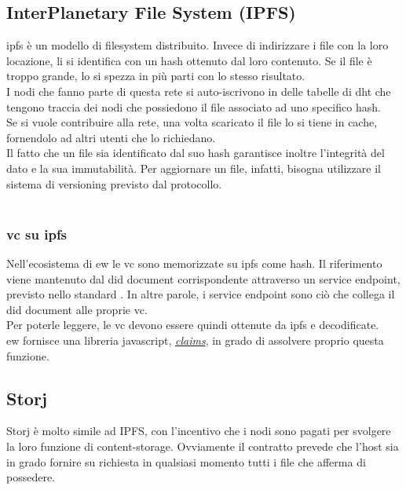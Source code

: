 \subsection{InterPlanetary File System (IPFS)}
\gls{ipfs} \cite{prod:ipfs} è un modello di filesystem distribuito.
Invece di indirizzare i file con la loro locazione, li si identifica con un hash ottenuto dal loro contenuto.
Se il file è troppo grande, lo si spezza in più parti con lo stesso risultato. \\
I nodi che fanno parte di questa rete si auto-iscrivono in delle tabelle di \gls{dht} che tengono traccia dei nodi che possiedono il file associato ad uno specifico hash. \\
Se si vuole contribuire alla rete, una volta scaricato il file lo si tiene in cache, fornendolo ad altri utenti che lo richiedano. \\
Il fatto che un file sia identificato dal suo hash garantisce inoltre l'integrità del dato e la sua immutabilità.
Per aggiornare un file, infatti, bisogna utilizzare il sistema di versioning previsto dal protocollo. \\ \\

\subsubsection{\gls{vc} su \gls{ipfs}}
Nell'ecosistema di \gls{ew} le \gls{vc} sono memorizzate su \gls{ipfs} come hash. 
Il riferimento viene mantenuto dal \gls{did} document corrispondente attraverso un service endpoint, previsto nello standard \cite{wiki:did}. 
In altre parole, i service endpoint sono ciò che collega il \gls{did} document alle proprie \gls{vc}. \\
Per poterle leggere, le \gls{vc} devono essere quindi ottenute da \gls{ipfs} e decodificate. \\
\gls{ew} fornisce una libreria javascript, \href{https://github.com/energywebfoundation/ew-did-registry/tree/development/packages/claims}{\textit{claims}}, in grado di assolvere proprio questa funzione.

\subsection{Storj}
Storj \cite{prod:storj} è molto simile ad IPFS, con l'incentivo che i nodi sono pagati per svolgere la loro funzione di content-storage.
Ovviamente il contratto prevede che l'host sia in grado fornire su richiesta in qualsiasi momento tutti i file che afferma di possedere.

